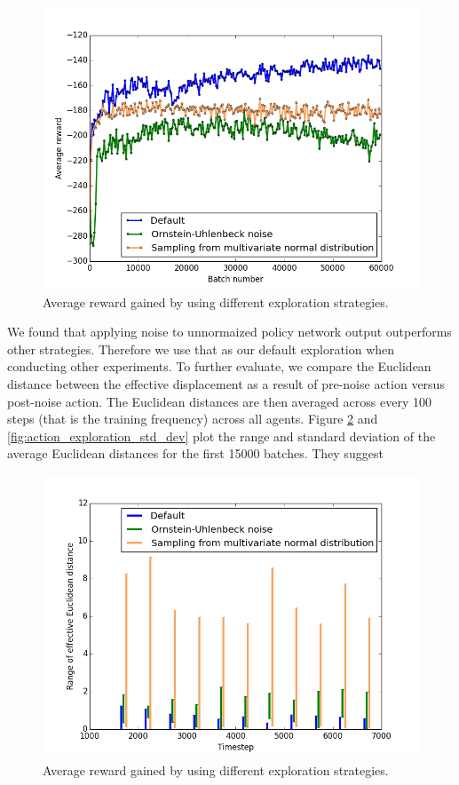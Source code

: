 \documentclass{article}
\begin{document}
\begin{figure}
\begin{center}
\includegraphics[scale=0.4]{defaultVSouVSdist}
\end{center}
\caption{Average reward gained by using different exploration strategies.}
\label{fig:defaultVSouVSdist}
\end{figure}

We found that applying noise to unnormaized policy network output outperforms other strategies. Therefore we use that as our default exploration when conducting other experiments. To further evaluate, we compare the Euclidean distance between the effective displacement as a result of pre-noise action versus post-noise action. The Euclidean distances are then averaged across every 100 steps (that is the training frequency) across all agents. Figure \ref{fig:action_exploration_range} and \ref{fig:action_exploration_std_dev} plot the range and standard deviation of the average Euclidean distances for the first 15000 batches. They suggest 

\begin{figure}
\begin{center}
\includegraphics[scale=0.4]{action_exploration_range}
\end{center}
\caption{Average reward gained by using different exploration strategies.}
\label{fig:action_exploration_range}
\end{figure}
\end{document}
